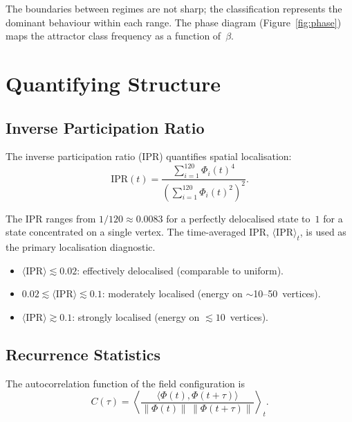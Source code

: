 \documentclass[12pt,a4paper]{article}
\begin{document}
The boundaries between regimes are not sharp; the classification
represents the dominant behaviour within each range.  The phase diagram
(Figure~\ref{fig:phase}) maps the attractor class frequency as a
function of~$\beta$.


\section{Quantifying Structure}\label{sec:quantify}

\subsection{Inverse Participation Ratio}\label{sec:ipr}

The inverse participation ratio (IPR) quantifies spatial localisation:
\begin{equation}\label{eq:ipr}
  \mathrm{IPR}(t) = \frac{\sum_{i=1}^{120} \Phi_i(t)^4}
    {\left(\sum_{i=1}^{120} \Phi_i(t)^2\right)^2}.
\end{equation}

The IPR ranges from $1/120 \approx 0.0083$ for a perfectly delocalised
state to~$1$ for a state concentrated on a single vertex.  The
time-averaged IPR, $\langle \mathrm{IPR} \rangle_t$, is used as the
primary localisation diagnostic.

\begin{itemize}[nosep]
\item $\langle \mathrm{IPR} \rangle \lesssim 0.02$:
  effectively delocalised (comparable to uniform).
\item $0.02 \lesssim \langle \mathrm{IPR} \rangle \lesssim 0.1$:
  moderately localised (energy on $\sim$10--50~vertices).
\item $\langle \mathrm{IPR} \rangle \gtrsim 0.1$:
  strongly localised (energy on $\lesssim 10$~vertices).
\end{itemize}

\subsection{Recurrence Statistics}\label{sec:recurrence}

The autocorrelation function of the field configuration is
\begin{equation}\label{eq:autocorr}
  C(\tau) = \left\langle
    \frac{\langle \Phi(t), \Phi(t+\tau) \rangle}
         {\lVert \Phi(t) \rVert \, \lVert \Phi(t+\tau) \rVert}
  \right\rangle_t.
\end{equation}
\end{document}
